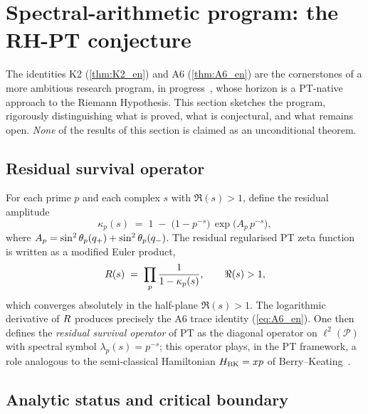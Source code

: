 \section{Spectral-arithmetic program: the RH-PT conjecture}
\label{sec:programme}

The identities K2 (\ref{thm:K2_en}) and A6 (\ref{thm:A6_en}) are the cornerstones of a more ambitious research program, in progress~\cite{PT_NewMath_Consolidation}, whose horizon is a PT-native approach to the Riemann Hypothesis. This section sketches the program, rigorously distinguishing what is proved, what is conjectural, and what remains open. \emph{None} of the results of this section is claimed as an unconditional theorem.

\subsection{Residual survival operator}
\label{sec:programme:operateur}

For each prime $p$ and each complex $s$ with $\Re(s) > 1$, define the residual amplitude
\[
\kappa_p(s) \;=\; 1 \;-\; \bigl(1 - p^{-s}\bigr)\,\exp\!\bigl(A_p\, p^{-s}\bigr),
\]
where $A_p = \sin^{2}\theta_{p}(q_{+}) + \sin^{2}\theta_{p}(q_{-})$. The residual regularised PT zeta function is written as a modified Euler product,
\[
R(s) \;=\; \prod_{p} \dfrac{1}{1 - \kappa_p(s)},
\qquad \Re(s) > 1,
\]
which converges absolutely in the half-plane $\Re(s) > 1$. The logarithmic derivative of $R$ produces precisely the A6 trace identity (\eqref{eq:A6_en}). One then defines the \emph{residual survival operator} of PT as the diagonal operator on $\ell^{2}(\mathcal P)$ with spectral symbol $\lambda_p(s) = p^{-s}$; this operator plays, in the PT framework, a role analogous to the semi-classical Hamiltonian $H_{\rm BK} = xp$ of Berry--Keating~\cite{BerryKeating1999}.

\subsection{Analytic status and critical boundary}
\label{sec:programme:statut}

